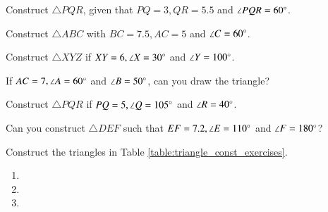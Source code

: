 


\item Construct $\triangle PQR$, given that $PQ = 3, QR = 5.5$ and $\angle PQR = 60 \degree$.
\\
\solution

%
\item Construct $\triangle ABC$  with $BC = 7.5, AC = 5$ and $\angle C = 60\degree$.
\\
\solution

\item Construct $\triangle XYZ$ if $XY = 6, \angle X = 30\degree$ and $\angle Y = 100 \degree$.
\\
\solution


\item If $AC = 7, \angle A = 60\degree$ and $\angle B = 50 \degree$, can you draw the triangle?
%
\\
\solution


\item Construct $\triangle PQR$ if $PQ = 5, \angle Q = 105 \degree$ and $\angle R = 40 \degree$.
\item Can you construct $\triangle DEF$ such that $EF = 7.2, \angle E = 110\degree$ and $\angle F = 180\degree$?
\item Construct the  triangles in Table \ref{table:triangle_const_exercises}.
\begin{table}[!ht]
\centering

\caption{}
\label{table:triangle_const_exercises}
\end{table}
\solution
\begin{enumerate}
    \item
    \item 
    \solution
    
    \item 
    \solution
    
        
\end{enumerate}
%
